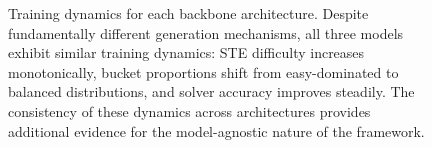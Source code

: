\begin{figure}[tb]
  \centering
  \caption{Training dynamics for each backbone architecture. Despite fundamentally different generation mechanisms, all three models exhibit similar training dynamics: STE difficulty increases monotonically, bucket proportions shift from easy-dominated to balanced distributions, and solver accuracy improves steadily. The consistency of these dynamics across architectures provides additional evidence for the model-agnostic nature of the framework.}
  \label{fig:sup_per_model_dynamics}
\end{figure}

